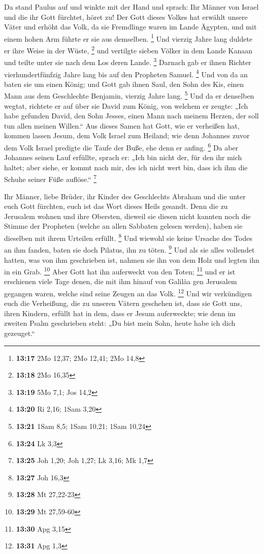  Da stand Paulus auf und winkte mit der Hand und sprach:
Ihr Männer von Israel und die ihr Gott fürchtet, höret zu!
 Der Gott dieses Volkes hat erwählt unsere Väter und
erhöht das Volk, da sie Fremdlinge waren im Lande Ägypten, und mit einem
hohen Arm führte er sie aus demselben. \footnote{\textbf{13:17} 2Mo
  12,37; 2Mo 12,41; 2Mo 14,8}  Und vierzig Jahre lang
duldete er ihre Weise in der Wüste, \footnote{\textbf{13:18} 2Mo 16,35}
 und vertilgte sieben Völker in dem Lande Kanaan und
teilte unter sie nach dem Los deren Lande. \footnote{\textbf{13:19} 5Mo
  7,1; Jos 14,2}  Darnach gab er ihnen Richter
vierhundertfünfzig Jahre lang bis auf den Propheten Samuel. \footnote{\textbf{13:20}
  Ri 2,16; 1Sam 3,20}  Und von da an baten sie um einen
König; und Gott gab ihnen Saul, den Sohn des Kis, einen Mann aus dem
Geschlechte Benjamin, vierzig Jahre lang. \footnote{\textbf{13:21} 1Sam
  8,5; 1Sam 10,21; 1Sam 10,24}  Und da er denselben
wegtat, richtete er auf über sie David zum König, von welchem er zeugte:
„Ich habe gefunden David, den Sohn Jesses, einen Mann nach meinem
Herzen, der soll tun allen meinen Willen.``  Aus dieses
Samen hat Gott, wie er verheißen hat, kommen lassen Jesum, dem Volk
Israel zum Heiland;  wie denn Johannes zuvor dem Volk
Israel predigte die Taufe der Buße, ehe denn er anfing. \footnote{\textbf{13:24}
  Lk 3,3}  Da aber Johannes seinen Lauf erfüllte, sprach
er: „Ich bin nicht der, für den ihr mich haltet; aber siehe, er kommt
nach mir, des ich nicht wert bin, dass ich ihm die Schuhe seiner Füße
auflöse.`` \footnote{\textbf{13:25} Joh 1,20; Joh 1,27; Lk 3,16; Mk 1,7}

 Ihr Männer, liebe Brüder, ihr Kinder des Geschlechts
Abraham und die unter euch Gott fürchten, euch ist das Wort dieses Heils
gesandt.  Denn die zu Jerusalem wohnen und ihre Obersten,
dieweil sie diesen nicht kannten noch die Stimme der Propheten (welche
an allen Sabbaten gelesen werden), haben sie dieselben mit ihrem
Urteilen erfüllt. \footnote{\textbf{13:27} Joh 16,3}  Und
wiewohl sie keine Ursache des Todes an ihm fanden, baten sie doch
Pilatus, ihn zu töten. \footnote{\textbf{13:28} Mt 27,22-23}
 Und als sie alles vollendet hatten, was von ihm
geschrieben ist, nahmen sie ihn von dem Holz und legten ihn in ein Grab.
\footnote{\textbf{13:29} Mt 27,59-60}  Aber Gott hat ihn
auferweckt von den Toten; \footnote{\textbf{13:30} Apg 3,15}
 und er ist erschienen viele Tage denen, die mit ihm
hinauf von Galiläa gen Jerusalem gegangen waren, welche sind seine
Zeugen an das Volk. \footnote{\textbf{13:31} Apg 1,3} 
Und wir verkündigen euch die Verheißung, die zu unseren Vätern geschehen
ist,  dass sie Gott uns, ihren Kindern, erfüllt hat in
dem, dass er Jesum auferweckte; wie denn im zweiten Psalm geschrieben
steht: „Du bist mein Sohn, heute habe ich dich gezeuget.``

